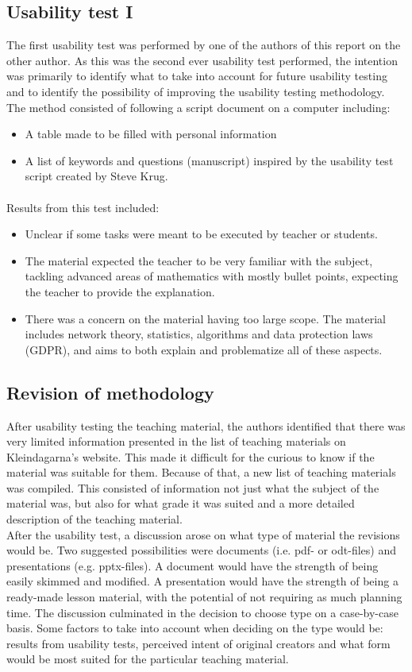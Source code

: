 \subsection{Usability test I}
The first usability test was performed by one of the authors of this report on the other author. As this was the second ever usability test performed, the intention was primarily to identify what to take into account for future usability testing and to identify the possibility of improving the usability testing methodology. The method consisted of following a script document on a computer including:
\begin{itemize}
    \item A table made to be filled with personal information
    \item A list of keywords and questions (manuscript) inspired by the usability test script created by Steve Krug.
\end{itemize}

\paragraph*{}
Results from this test included:
\begin{itemize}
    \item Unclear if some tasks were meant to be executed by teacher or students.
    \item The material expected the teacher to be very familiar with the subject, tackling advanced areas of mathematics with mostly bullet points, expecting the teacher to provide the explanation.
    \item There was a concern on the material having too large scope. The material includes network theory, statistics, algorithms and data protection laws (GDPR), and aims to both explain and problematize all of these aspects.
\end{itemize}
\subsection{Revision of methodology}
After usability testing the teaching material, the authors identified that there was very limited information presented in the list of teaching materials on Kleindagarna's website. This made it difficult for the curious to know if the material was suitable for them. Because of that, a new list of teaching materials was compiled. This consisted of information not just what the subject of the material was, but also for what grade it was suited and a more detailed description of the teaching material.\\
After the usability test, a discussion arose on what type of material the revisions would be. Two suggested possibilities were documents (i.e. pdf- or odt-files) and presentations (e.g. pptx-files). A document would have the strength of being easily skimmed and modified. A presentation would have the strength of being a ready-made lesson material, with the potential of not requiring as much planning time. The discussion culminated in the decision to choose type on a case-by-case basis. Some factors to take into account when deciding on the type would be: results from usability tests, perceived intent of original creators and what form would be most suited for the particular teaching material.
